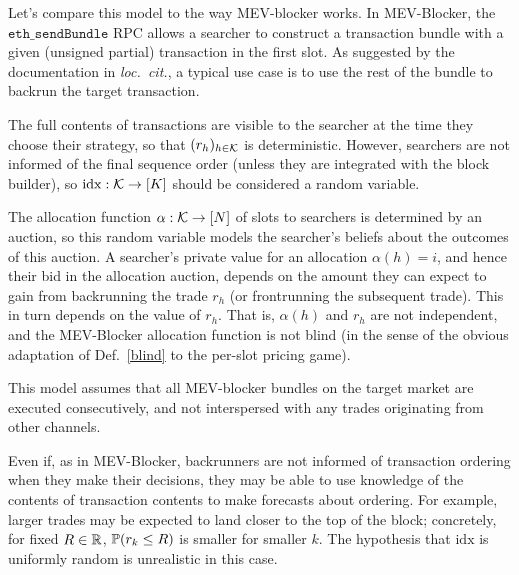 \begin{example} \label{mev-blocker}

  Let's compare this model to the way MEV-blocker \cite{mevblocker2023docs} works.
  In MEV-Blocker, the $\mathtt{eth\_sendBundle}$ RPC allows a searcher to construct a transaction bundle with a given (unsigned partial) transaction in the first slot.
  As suggested by the documentation in \emph{loc.~cit.}, a typical use case is to use the rest of the bundle to backrun the target transaction.
  
  The full contents of transactions are visible to the searcher at the time they choose their strategy, so that $(r_h)_{h\in\mathcal{K}}$ is deterministic.
  However, searchers are not informed of the final sequence order (unless they are integrated with the block builder), so $\mathrm{idx}:\mathcal{K}\rightarrow[K]$ should be considered a random variable.
  
  The allocation function $\alpha:\mathcal{K}\rightarrow[N]$ of slots to searchers is determined by an auction, so this random variable models the searcher's beliefs about the outcomes of this auction.
  A searcher's private value for an allocation $\alpha(h)=i$, and hence their bid in the allocation auction, depends on the amount they can expect to gain from backrunning the trade $r_h$ (or frontrunning the subsequent trade).
  This in turn depends on the value of $r_h$.
  That is, $\alpha(h)$ and $r_h$ are not independent, and the MEV-Blocker allocation function is not blind (in the sense of the obvious adaptation of Def.~\ref{blind} to the per-slot pricing game).
  
  This model assumes that all MEV-blocker bundles on the target market are executed consecutively, and not interspersed with any trades originating from other channels.

\end{example}

\begin{remark}

  Even if, as in MEV-Blocker, backrunners are not informed of transaction ordering when they make their decisions, they may be able to use knowledge of the contents of transaction contents to make forecasts about ordering. 
  For example, larger trades may be expected to land closer to the top of the block; concretely, for fixed $R\in\mathbb R$, $\mathbb{P}(r_k\leq R)$ is smaller for smaller $k$.
  The hypothesis that $\mathrm{idx}$ is uniformly random is unrealistic in this case.

\end{remark}


